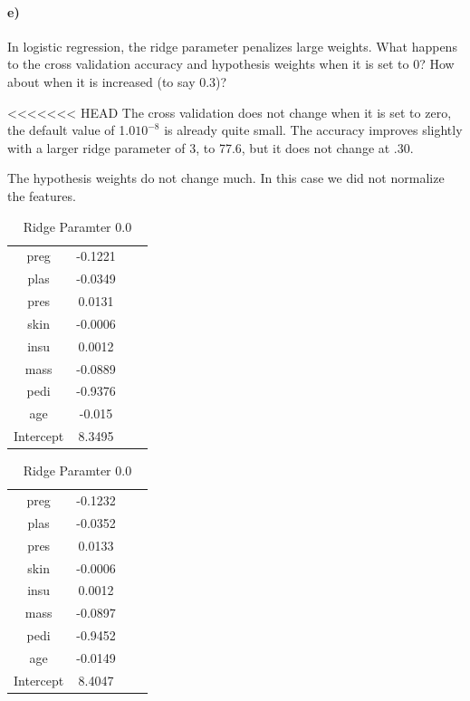 \documentclass{article}
\begin{document}
\begin{table}[H]
\begin{table}[H]
\begin{table}[H]
\paragraph{e)}
In logistic regression, the ridge parameter penalizes large weights. What happens to the cross validation accuracy and hypothesis weights when it is set to 0? How about when it is increased (to say 0.3)?

<<<<<<< HEAD
The cross validation does not change when it is set to zero, the default value of 1.0$10^{-8}$ is already quite small. The accuracy improves slightly with a larger ridge parameter of 3, to 77.6, but it does not change at .30. 

The hypothesis weights do not change much. In this case we did not normalize the features. 

\begin{table}[H]
    \begin{center}
    \caption{Ridge Paramter .3}
    \begin{tabular}{|c|c|c|c|}
   \hline
preg          &        -0.1221\\
plas             &     -0.0349\\
pres               &    0.0131\\
skin              &   -0.0006\\
insu               &    0.0012\\
mass              &    -0.0889\\
pedi             &     -0.9376\\
age            &        -0.015\\
Intercept      &        8.3495\\ %
\hline
    \end{tabular}
    \end{center}
\end{table}

\begin{table}[H]
    \begin{center}
    \caption{Ridge Paramter 0.0}
    \begin{tabular}{|c|c|c|c|}
   \hline
preg          &       -0.1232\\
plas             &      -0.0352\\
pres               &    0.0133\\
skin              &   -0.0006\\
insu               &    0.0012\\
mass              &     -0.0897\\
pedi             &     -0.9452\\
age            &        -0.0149\\
Intercept      &        8.4047\\ %
\hline
    \end{tabular}
    \end{center}
\end{table}



\end{table}
\end{table}
\end{table}
\end{document}
